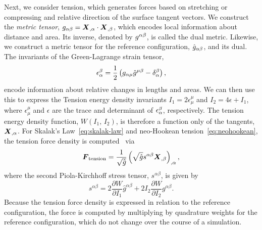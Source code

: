 Next, we consider tension, which generates forces based on stretching or compressing
and relative direction of the surface tangent vectors. We construct the \emph{metric
tensor}, $g_{\alpha\beta} = \boldsymbol{X}_{,\alpha}\cdot\boldsymbol{X}_{,\beta}$, which encodes local
information about distance and area. Its inverse, denoted by $g^{\alpha\beta}$, is
called the dual metric. Likewise, we construct a metric tensor for the reference
configuration, $\hat{g}_{\alpha\beta}$, and its dual. The invariants of the
Green-Lagrange strain tensor,
\begin{equation}
    \epsilon_\alpha^\beta = \frac12\left(g_{\alpha\mu}\hat{g}^{\mu\beta}-\delta_\alpha^\beta\right),
\end{equation}
encode information about relative changes in lengths and areas. We can then use this to
express the Tension energy density invariants $I_1 = 2\epsilon_\mu^\mu$ and
$I_2 = 4\epsilon + I_1$, where $\epsilon_\mu^\mu$ and $\epsilon$ are the trace and
determinant of $\epsilon_\alpha^{\smash\beta}$, respectively. The tension energy density
function, $W(I_1,\,I_2)$, is therefore a function only of the tangents, $\boldsymbol{X}_{,\alpha}$.
For Skalak's Law~\eqref{eq:skalak-law} and neo-Hookean tension~\eqref{eq:neohookean}, the
tension force density is computed~\cite{Maxian:2018ek} via
\begin{equation}\label{eq:tension-force}
    \boldsymbol{F}_\text{tension} = \frac{1}{\sqrt{\hat{g}}}\left(\sqrt{\hat{g}}s^{\alpha\beta}\boldsymbol{X}_{,\beta}\right)_{,\alpha},
\end{equation}
where the second Piola-Kirchhoff stress tensor, $s^{\alpha\beta}$, is given by
\begin{equation}
    s^{\alpha\beta} = 2\frac{\partial W}{\partial I_1} \hat{g}^{\alpha\beta} + 2I_2\frac{\partial W}{\partial I_2} g^{\alpha\beta}.
\end{equation}
Because the tension force density is expressed in relation to the reference
configuration, the force is computed by multiplying by quadrature weights for the
reference configuration, which do not change over the course of a simulation.

